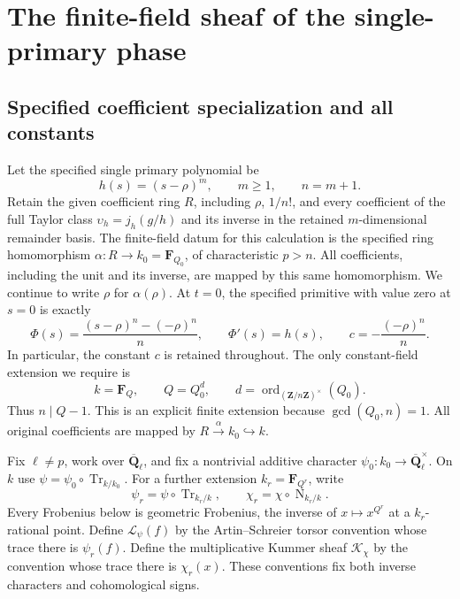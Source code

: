 \section{The finite-field sheaf of the single-primary phase}
\label{sec:SPF}

\subsection{Specified coefficient specialization and all constants}

Let the specified single primary polynomial be
\[
 h(s)=(s-\rho)^m,\qquad m\geq1,\qquad n=m+1.
 \tag{SPF.1}\label{eq:SPF1}
\]
Retain the given coefficient ring \(R\), including \(\rho\), \(1/n!\),
and every coefficient of the full Taylor class
\(\upsilon_h=j_h(g/h)\) and its inverse in the retained
\(m\)-dimensional remainder basis.
The finite-field datum for this calculation is the specified ring
homomorphism
\(\alpha:R\longrightarrow k_0=\mathbf F_{Q_0}\), of characteristic
\(p>n\). All coefficients, including the unit and its inverse, are
mapped by this same homomorphism. We continue to write \(\rho\) for
\(\alpha(\rho)\). At \(t=0\), the specified primitive with value zero
at \(s=0\) is exactly
\[
 \Phi(s)=\frac{(s-\rho)^n-(-\rho)^n}{n},\qquad
 \Phi'(s)=h(s),\qquad
 c=-\frac{(-\rho)^n}{n}.
 \tag{SPF.2}\label{eq:SPF2}
\]
In particular, the constant \(c\) is retained throughout. The only
constant-field extension we require is
\[
 k=\mathbf F_Q,\qquad Q=Q_0^d,\qquad
 d=\operatorname{ord}_{(\mathbf Z/n\mathbf Z)^\times}(Q_0).
 \tag{SPF.3}\label{eq:SPF3}
\]
Thus \(n\mid Q-1\). This is an explicit finite extension because
\(\gcd(Q_0,n)=1\). All original coefficients are mapped by
\(R\xrightarrow{\alpha}k_0\hookrightarrow k\).

Fix \(\ell\ne p\), work over \(\overline{\mathbf Q}_\ell\), and fix a
nontrivial additive character \(\psi_0:k_0\to
\overline{\mathbf Q}_\ell^\times\). On \(k\) use
\(\psi=\psi_0\circ\operatorname{Tr}_{k/k_0}\).
For a further extension \(k_r=\mathbf F_{Q^r}\), write
\[
 \psi_r=\psi\circ\operatorname{Tr}_{k_r/k},\qquad
 \chi_r=\chi\circ\operatorname{N}_{k_r/k}.
 \tag{SPF.4}\label{eq:SPF4}
\]
Every Frobenius below is geometric Frobenius, the inverse of
\(x\mapsto x^{Q^r}\) at a \(k_r\)-rational point. Define
\(\mathcal L_\psi(f)\) by the Artin--Schreier torsor convention whose
trace there is \(\psi_r(f)\). Define the multiplicative Kummer sheaf
\(\mathcal K_\chi\) by the convention whose trace there is
\(\chi_r(x)\). These conventions fix both inverse characters and
cohomological signs.

